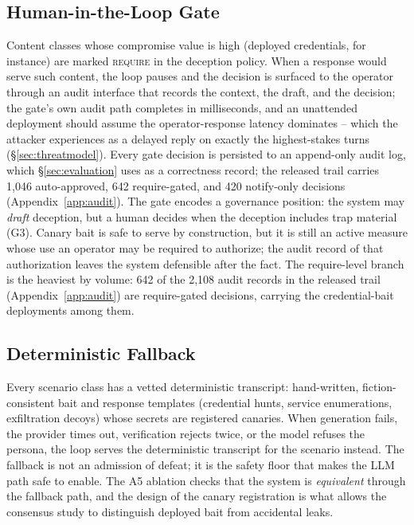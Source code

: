 \subsection{Human-in-the-Loop Gate}
\label{sec:hitl}
Content classes whose compromise value is high (deployed credentials,
for instance) are marked \textsc{require} in the deception policy. When a
response would serve such content, the loop pauses and the decision is
surfaced to the operator through an audit interface that records the
context, the draft, and the decision; the gate's own audit path
completes in milliseconds, and an unattended deployment should assume
the operator-response latency dominates -- which the attacker
experiences as a delayed reply on exactly the highest-stakes turns
(\S\ref{sec:threatmodel}). Every gate decision is persisted to
an append-only audit log, which \S\ref{sec:evaluation} uses as a
correctness record; the released trail carries 1{,}046 auto-approved,
642 require-gated, and 420 notify-only decisions
(Appendix~\ref{app:audit}).
The gate encodes a governance position: the system may \emph{draft}
deception, but a human decides when the deception includes trap
material (G3). Canary bait is safe to serve by construction, but it is
still an active measure whose use an operator may be required to
authorize; the audit record of that authorization leaves the system
defensible after the fact. The require-level branch is the heaviest by
volume: 642 of the 2{,}108 audit records in the released trail
(Appendix~\ref{app:audit}) are require-gated decisions, carrying the
credential-bait deployments among them.

\subsection{Deterministic Fallback}
\label{sec:fallback}
Every scenario class has a vetted deterministic transcript: hand-written,
fiction-consistent bait and response templates (credential hunts, service
enumerations, exfiltration decoys) whose secrets are registered canaries.
When generation fails, the provider times out, verification rejects twice,
or the model refuses the persona, the loop serves the deterministic
transcript for the scenario instead. The fallback is not an admission of
defeat; it is the safety floor that makes the LLM path safe to enable.
The A5 ablation checks that the system is \emph{equivalent} through the
fallback path, and the design of the canary registration is what allows
the consensus study to distinguish deployed bait from accidental leaks.

